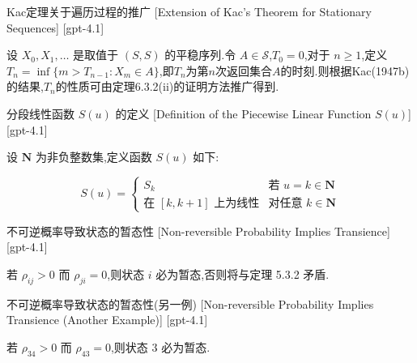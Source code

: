 \documentclass[UTF8]{ctexart}
\begin{document}
    
    
    \begin{thm}
        {Kac定理关于遍历过程的推广}
        [Extension of Kac's Theorem for Stationary Sequences]
        [gpt-4.1]
        
设 $X_{0}, X_{1}, \ldots$ 是取值于 $(S, S)$ 的平稳序列.令 $A \in {\mathcal{S}}$,$T_{0} = 0$,对于 $n \geq 1$,定义 $T_{n} = \operatorname{inf} \{ m > T_{n-1} : X_{m} \in A \}$,即$T_n$为第$n$次返回集合$A$的时刻.则根据Kac(1947b)的结果,$T_n$的性质可由定理6.3.2(ii)的证明方法推广得到.

    \end{thm}
    
    
    
    \begin{dfn}
        {分段线性函数 $S(u)$ 的定义}
        [Definition of the Piecewise Linear Function $S(u)$]
        [gpt-4.1]
        
设 $\mathbf{N}$ 为非负整数集,定义函数 $S(u)$ 如下:

\[
S(u) = \left\{
\begin{array}{cl}
S_{k} & \text{若 } u = k \in \mathbf{N} \\
\text{在 } [k, k + 1] \text{ 上为线性} & \text{对任意 } k \in \mathbf{N}
\end{array}
\right.
\]

    \end{dfn}
    
    
    
    \begin{thm}
        {不可逆概率导致状态的暂态性}
        [Non-reversible Probability Implies Transience]
        [gpt-4.1]
        
若 $\rho_{ij} > 0$ 而 $\rho_{ji} = 0$,则状态 $i$ 必为暂态,否则将与定理 5.3.2 矛盾.

    \end{thm}
    
    
    
    \begin{thm}
        {不可逆概率导致状态的暂态性(另一例)}
        [Non-reversible Probability Implies Transience (Another Example)]
        [gpt-4.1]
        
若 $\rho_{34} > 0$ 而 $\rho_{43} = 0$,则状态 $3$ 必为暂态.

    \end{thm}
    
\end{document}
